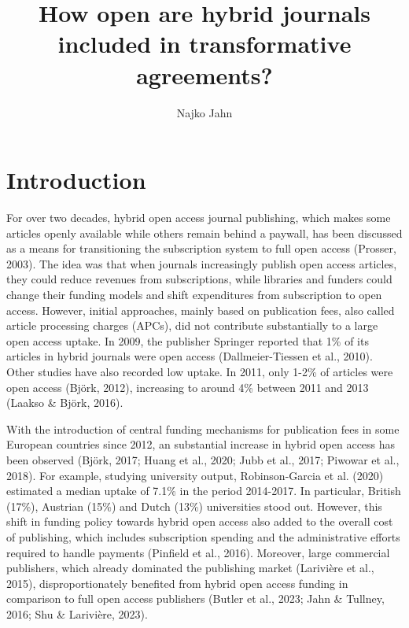 \documentclass[a4paper,man,floatsintext,longtable,noextraspace,12pt]{apa6}
\title{\textbf{How open are hybrid journals included in transformative agreements?}}
\author{Najko Jahn}
\affiliation{Göttingen State and University Library, University of Göttingen\\
Platz der Göttinger Sieben 1, 37073 Göttingen, Germany\\
najko.jahn@sub.uni-goettingen.de
}
\begin{document}
\maketitle

\setcounter{secnumdepth}{2}

\section{Introduction}\label{introduction}

For over two decades, hybrid open access journal publishing, which makes
some articles openly available while others remain behind a paywall, has
been discussed as a means for transitioning the subscription system to
full open access (Prosser, 2003). The idea was that when journals
increasingly publish open access articles, they could reduce revenues
from subscriptions, while libraries and funders could change their
funding models and shift expenditures from subscription to open access.
However, initial approaches, mainly based on publication fees, also
called article processing charges (APCs), did not contribute
substantially to a large open access uptake. In 2009, the publisher
Springer reported that 1\% of its articles in hybrid journals were open
access (Dallmeier-Tiessen et al., 2010). Other studies have also
recorded low uptake. In 2011, only 1-2\% of articles were open access
(Björk, 2012), increasing to around 4\% between 2011 and 2013 (Laakso \&
Björk, 2016).

With the introduction of central funding mechanisms for publication fees
in some European countries since 2012, an substantial increase in hybrid
open access has been observed (Björk, 2017; Huang et al., 2020; Jubb et
al., 2017; Piwowar et al., 2018). For example, studying university
output, Robinson-Garcia et al. (2020) estimated a median uptake of 7.1\%
in the period 2014-2017. In particular, British (17\%), Austrian (15\%)
and Dutch (13\%) universities stood out. However, this shift in funding
policy towards hybrid open access also added to the overall cost of
publishing, which includes subscription spending and the administrative
efforts required to handle payments (Pinfield et al., 2016). Moreover,
large commercial publishers, which already dominated the publishing
market (Larivière et al., 2015), disproportionately benefited from
hybrid open access funding in comparison to full open access publishers
(Butler et al., 2023; Jahn \& Tullney, 2016; Shu \& Larivière, 2023).
\end{document}
